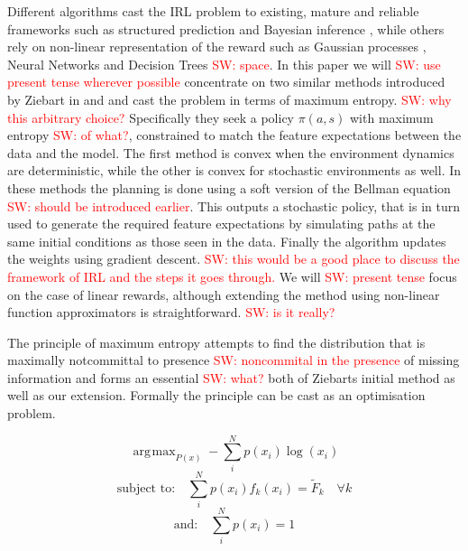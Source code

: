 \documentclass[letterpaper]{article}
\DeclareMathOperator*{\argmax}{\arg\!\max}
\newcommand{\sw}[1]{\textcolor{red}{SW: #1}}
\begin{document}
Different algorithms cast the IRL problem to existing, mature and reliable frameworks such as structured prediction \cite{ratliff2006maximum} and Bayesian inference \cite{ramachandran2007bayesian}, while others rely on non-linear representation of the reward such as Gaussian processes \cite{levine2011nonlinear}, Neural Networks and Decision Trees\cite{ratliff2007boosting} \sw{space}. In this paper we will \sw{use present tense wherever possible} concentrate on two similar methods introduced by Ziebart in \cite{ziebart2008maximum} and \cite{ziebart2010modelingthesis} and cast the problem in terms of maximum entropy. \sw{why this arbitrary choice?} Specifically they seek a policy $\pi(a,s)$ with maximum entropy \sw{of what?}, constrained to match the feature expectations between the data and the model. The first method is convex when the environment dynamics are deterministic, while the other is convex for stochastic environments as well. In these methods the planning is done using a soft version of the Bellman equation\cite{sutton1998reinforcement} \sw{should be introduced earlier}. This outputs a stochastic policy, that is in turn used to generate the required feature expectations by simulating paths at the same initial conditions as those seen in the data. Finally the algorithm updates the weights using gradient descent.  \sw{this would be a good place to discuss the framework of IRL and the steps it goes through.} We will \sw{present tense} focus on the case of linear rewards, although extending the method using non-linear function approximators is straightforward. \sw{is it really?}

The principle of maximum entropy attempts to find the distribution that is maximally notcommittal to presence \sw{noncommital in the presence} of missing information \cite{jaynes1957information} and forms an essential \sw{what?} both of Ziebarts initial method as well as our extension. Formally the principle can be cast as an optimisation problem.

	\begin{equation}
	\argmax_{P(x)} -\sum_i^N p(x_i)\log(x_i)
	\end{equation}
	\begin{equation}
	\text{subject to:} \quad \sum_i^N p(x_i)f_k(x_i) = \widetilde{F}_k \quad \forall k \label{eqn:constraint1}
	\end{equation}
	\begin{equation}
	\text{and:} \quad \sum_i^N p(x_i) = 1 \label{eqn:constraint2}
	\end{equation}
\end{document}
